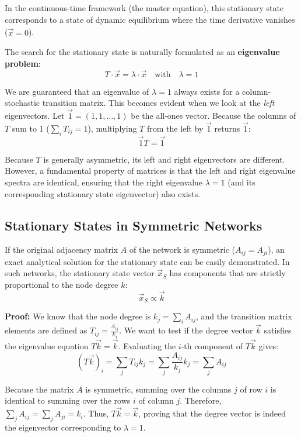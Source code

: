 In the continuous-time framework (the master equation), this stationary state corresponds to a state of dynamic equilibrium where the time derivative vanishes ($\dot{\vec{x}} = 0$).

The search for the stationary state is naturally formulated as an \textbf{eigenvalue problem}:
\[
    T \cdot \vec{x} = \lambda \cdot \vec{x} \quad \text{with} \quad \lambda = 1
\]


We are guaranteed that an eigenvalue of $\lambda = 1$ always exists for a column-stochastic transition matrix. This becomes evident when we look at the \textit{left} eigenvectors. Let $\vec{1} = (1, 1, \dots, 1)$ be the all-ones vector. Because the columns of $T$ sum to 1 ($\sum_i T_{ij} = 1$), multiplying $T$ from the left by $\vec{1}$ returns $\vec{1}$:
\[
    \vec{1} T = \vec{1}
\]

Because $T$ is generally asymmetric, its left and right eigenvectors are different. However, a fundamental property of matrices is that the left and right eigenvalue spectra are identical, ensuring that the right eigenvalue $\lambda = 1$ (and its corresponding stationary state eigenvector) also exists.

\subsection{Stationary States in Symmetric Networks}

If the original adjacency matrix $A$ of the network is symmetric ($A_{ij} = A_{ji}$), an exact analytical solution for the stationary state can be easily demonstrated. In such networks, the stationary state vector $\vec{x}_S$ has components that are strictly proportional to the node degree $k$:
\[
    \vec{x}_S \propto \vec{k}
\]


\textbf{Proof:} We know that the node degree is $k_j = \sum_i A_{ij}$, and the transition matrix elements are defined as $T_{ij} = \frac{A_{ij}}{k_j}$. We want to test if the degree vector $\vec{k}$ satisfies the eigenvalue equation $T\vec{k} = \vec{k}$. Evaluating the $i$-th component of $T\vec{k}$ gives:
\[
    (T\vec{k})_i = \sum_{j} T_{ij} k_j = \sum_{j} \frac{A_{ij}}{k_j} k_j = \sum_{j} A_{ij}
\]

Because the matrix $A$ is symmetric, summing over the columns $j$ of row $i$ is identical to summing over the rows $i$ of column $j$. Therefore, $\sum_j A_{ij} = \sum_j A_{ji} = k_i$. Thus, $T\vec{k} = \vec{k}$, proving that the degree vector is indeed the eigenvector corresponding to $\lambda = 1$.

